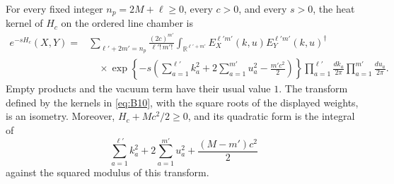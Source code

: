 \begin{lemma}
\label{lem:bethe-line}
For every fixed integer \(n_p=2M+\ell\geq0\), every \(c>0\), and every
\(s>0\), the heat kernel of \(H_c\) on the ordered line chamber is
\begin{equation}
\begin{split}
 e^{-sH_c}(X,Y)
  ={}&\sum_{\ell'+2m'=n_p}
       \frac{(2c)^{m'}}{\ell'!\,m'!}
       \int_{\mathbb R^{\ell'+m'}}
       E_X^{\ell'm'}(k,u)E_Y^{\ell'm'}(k,u)^\dagger\\
    &\quad{}\times
       \exp\left\{-s\left(
           \sum_{a=1}^{\ell'}k_a^2+
           2\sum_{a=1}^{m'}u_a^2-\frac{m'c^2}{2}
                    \right)\right\}
       \prod_{a=1}^{\ell'}\frac{dk_a}{2\pi}
       \prod_{a=1}^{m'}\frac{du_a}{2\pi}.
\end{split}
\label{eq:B10}
\end{equation}
Empty products and the vacuum term have their usual value \(1\).
The transform defined by the kernels in \eqref{eq:B10}, with the
square roots of the displayed weights, is an isometry.  Moreover,
\(H_c+Mc^2/2\geq0\), and its quadratic form is the integral of
\[
  \sum_{a=1}^{\ell'}k_a^2+
  2\sum_{a=1}^{m'}u_a^2+\frac{(M-m')c^2}{2}
\]
against the squared modulus of this transform.
\end{lemma}


